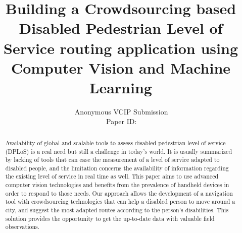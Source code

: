 \documentclass[10pt,conference,a4paper]{IEEEtran}
\title{Building a Crowdsourcing based Disabled Pedestrian Level of Service routing application using Computer Vision and Machine Learning}
\author{%
\,Anonymous VCIP Submission\\
\,Paper ID:

} %
\begin{document}
\maketitle

\begin{figure}[b]
\parbox{\hsize}{\em

}\end{figure}


\begin{abstract}
   Availability of global and scalable tools to assess disabled pedestrian level of service (DPLoS) is a real need but still a challenge in today’s world. It is usually summarized by lacking of tools that can ease the measurement of a level of service adapted to disabled people, and the limitation concerns the availability of information regarding the existing level of service in real time as well. This paper aims to use advanced computer vision technologies and benefits from the prevalence of handheld devices in order to respond to those needs. Our approach allows the development of a navigation tool with crowdsourcing technologies that can help a disabled person to move around a city, and suggest the most adapted routes according to the person’s disabilities. This solution provides the opportunity to get the up-to-date data with valuable field observations.
\\[1\baselineskip]
\end{abstract}

%

\end{document}
